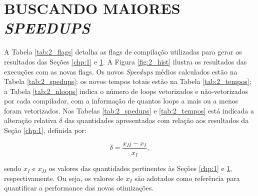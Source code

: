 
\chapter{BUSCANDO MAIORES \textit{SPEEDUPS}}
\label{chp:2}

A Tabela \ref{tab:2_flags} detalha as flags de compilação utilizadas para gerar os resultados das Seções \ref{chp:1} e \ref{chp:2}. A Figura \ref{fig:2_hist} ilustra os resultados das execuções com as novas flags. Os novos \textit{Speedups} médios calculados estão na Tabela \ref{tab:2_spedups}; os novos tempos totais estão na Tabela \ref{tab:2_tempos}; a Tabela \ref{tab:2_nloops} indica o número de loops vetorizados e não-vetorizados por cada compilador, com a informação de quantos loops a mais ou a menos foram vetorizados. Nas Tabelas \ref{tab:2_spedups} e \ref{tab:2_tempos} está indicada a alteração relativa $\delta$ das quantidades apresentadas com relação aos resultados da Seção \ref{chp:1}, definida por:

\begin{equation}
\delta = \frac{x_{II}-x_{I}}{x_{I}}, 
\end{equation}

sendo $x_{I}$ e $x_{II}$ os valores das quantidades pertinentes às Seções \ref{chp:1} e \ref{chp:2}, respectivamente. Ou seja, os valores de $x_{I}$ são adotados como referência para quantificar a performance das novas otimizações. 

